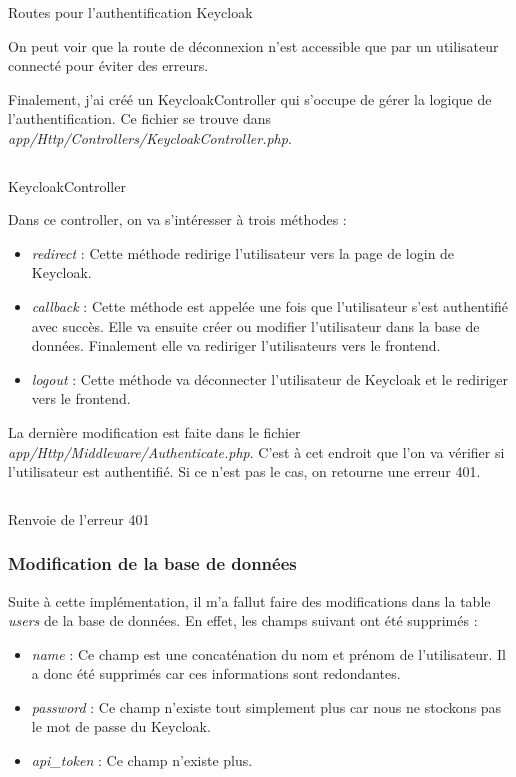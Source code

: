 \begin{listing}[H]
    \inputminted{php}{assets/code/routeKeycloak.php}
    \caption{Routes pour l'authentification Keycloak \label{routeKeycloak}}
\end{listing}

On peut voir que la route de déconnexion n'est accessible que par un utilisateur connecté pour éviter des erreurs.

Finalement, j'ai créé un KeycloakController qui s'occupe de gérer la logique de l'authentification. Ce fichier se trouve dans \emph{app/Http/Controllers/KeycloakController.php}.

\begin{listing}[H]
    \inputminted{php}{assets/code/keycloakController.php}
    \caption{KeycloakController \label{keycloakController}}
\end{listing}

Dans ce controller, on va s'intéresser à trois méthodes :
\begin{itemize}
    \item \emph{redirect} : Cette méthode redirige l'utilisateur vers la page de login de Keycloak.
    \item \emph{callback} : Cette méthode est appelée une fois que l'utilisateur s'est authentifié avec succès. Elle va ensuite créer ou modifier l'utilisateur dans la base de données. Finalement elle va rediriger l'utilisateurs vers le frontend.
    \item \emph{logout} : Cette méthode va déconnecter l'utilisateur de Keycloak et le rediriger vers le frontend.
\end{itemize}

La dernière modification est faite dans le fichier \emph{app/Http/Middleware/Authenticate.php}. C'est à cet endroit que l'on va vérifier si l'utilisateur est authentifié. Si ce n'est pas le cas, on retourne une erreur 401.

\begin{listing}[H]
    \inputminted{php}{assets/code/authenticate.php}
    \caption{Renvoie de l'erreur 401 \label{authenticate}}
\end{listing}


\subsubsection{Modification de la base de données}
Suite à cette implémentation, il m'a fallut faire des modifications dans la table \emph{users} de la base de données. En effet, les champs suivant ont été supprimés :
\begin{itemize}
    \item \emph{name} : Ce champ est une concaténation du nom et prénom de l'utilisateur. Il a donc été supprimés car ces informations sont redondantes.
    \item \emph{password} : Ce champ n'existe tout simplement plus car nous ne stockons pas le mot de passe du Keycloak.
    \item \emph{api\_token} : Ce champ n'existe plus.
\end{itemize}

